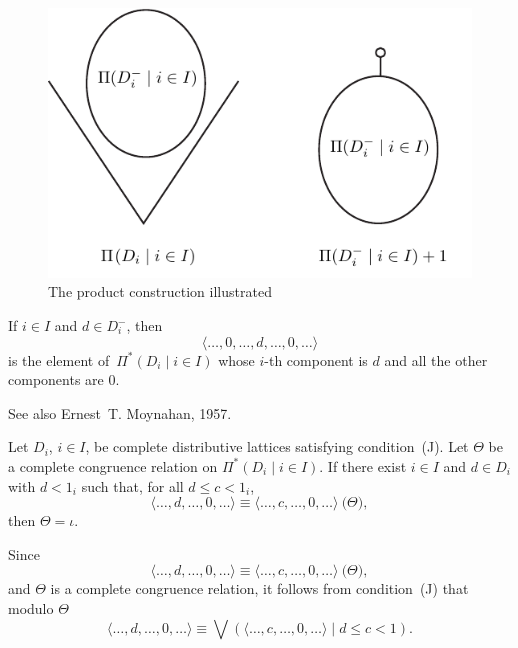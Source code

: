 \documentclass{foils}
\begin{document}
\begin{figure}[hbt]
\centering\includegraphics[scale=2]{products}
\caption{The product construction illustrated}\label{Fi:products}
\end{figure}



If $i \in I$ and $d \in D_{i}^{-}$, then
\[
  \langle \dots, 0, \dots, d, \dots, 0, \dots \rangle
\]
is the element of\, $\Pi^{*} ( D_{i} \mid i \in I )$ whose 
$i$-th component is $d$ and all the other components 
are $0$.


See also Ernest~T. Moynahan, 1957.


\begin{Theorem}\label{T:P*} 
Let $D_{i}$, $i \in I$, be complete distributive 
lattices satisfying condition~\textup{(J)}.  
Let $\Theta$ be a complete congruence relation on 
$\Pi^{*} ( D_{i} \mid i \in I )$. 
If there exist $i \in I$ and $d \in D_{i}$ with 
$d < 1_{i}$ such that, for all $d \leq c < 1_{i}$, 
\begin{equation*}\label{E:cong1} 
   \langle \dots, d, \dots, 0, \dots \rangle \equiv 
   \langle \dots, c, \dots, 0, \dots \rangle 
   \pod{\Theta}, 
\end{equation*}
then $\Theta = \iota$.
\end{Theorem}


Since 
\begin{equation*}
\langle \dots, d, \dots, 0, \dots \rangle \equiv 
\langle \dots, c, \dots, 0, \dots \rangle 
\pod{\Theta}, 
\end{equation*}
and $\Theta$ is a complete congruence relation, 
it follows from condition~(J) that modulo $\Theta$
\begin{equation*}\label{E:cong}
 \langle \dots, d, \dots, 0, \dots \rangle \equiv
 \bigvee ( \langle \dots, c, \dots, 0, \dots \rangle 
 \mid d \leq c < 1 ). 
\end{equation*}
\end{document}
